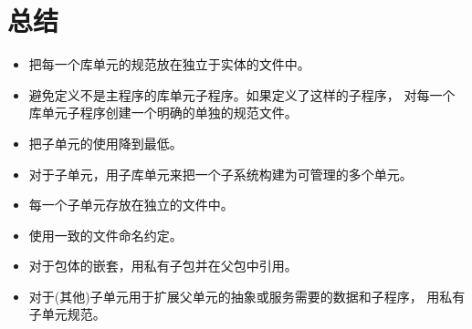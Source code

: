 %
%
%

\section{总结}
\begin{itemize}
\item 把每一个库单元的规范放在独立于实体的文件中。
\item 避免定义不是主程序的库单元子程序。如果定义了这样的子程序，
对每一个库单元子程序创建一个明确的单独的规范文件。
\item 把子单元的使用降到最低。
\item 对于子单元，用子库单元来把一个子系统构建为可管理的多个单元。
\item 每一个子单元存放在独立的文件中。
\item 使用一致的文件命名约定。
\item 对于包体的嵌套，用私有子包并在父包中引用。
\item 对于(其他)子单元用于扩展父单元的抽象或服务需要的数据和子程序，
 用私有子单元规范。

\end{itemize}
